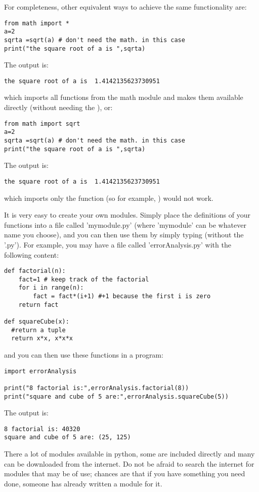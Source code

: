 For completeness, other equivalent ways to achieve the same functionality are:
\begin{lstlisting}[frame=single] 
from math import *
a=2
sqrta =sqrt(a) # don't need the math. in this case
print("the square root of a is ",sqrta)
\end{lstlisting}
The output is:
\begin{verbatim}
the square root of a is  1.4142135623730951
\end{verbatim}
which imports all functions from the math module and makes them available directly (without needing the ), or:
\begin{lstlisting}[frame=single] 
from math import sqrt
a=2
sqrta =sqrt(a) # don't need the math. in this case
print("the square root of a is ",sqrta)
\end{lstlisting}
The output is:
\begin{verbatim}
the square root of a is  1.4142135623730951
\end{verbatim}
which imports only the  function (so for example, ) would not work.

It is very easy to create your own modules. Simply place the definitions of your functions into a file called 'mymodule.py' (where 'mymodule' can be whatever name you choose), and you can then use them by simply typing  (without the '.py'). For example, you may have a file called 'errorAnalysis.py' with the following content:
\begin{lstlisting}[frame=single] 
def factorial(n):
    fact=1 # keep track of the factorial
    for i in range(n):
        fact = fact*(i+1) #+1 because the first i is zero
    return fact
    
def squareCube(x):
  #return a tuple
  return x*x, x*x*x    
\end{lstlisting}
and you can then use these functions in a program:
\begin{lstlisting}[frame=single] 
import errorAnalysis

print("8 factorial is:",errorAnalysis.factorial(8))
print("square and cube of 5 are:",errorAnalysis.squareCube(5))
\end{lstlisting}
The output is:
\begin{verbatim}
8 factorial is: 40320
square and cube of 5 are: (25, 125)
\end{verbatim}
There a lot of modules available in python, some are included directly and many can be downloaded from the internet. Do not be afraid to search the internet for modules that may be of use; chances are that if you have something you need done, someone has already written a module for it.
